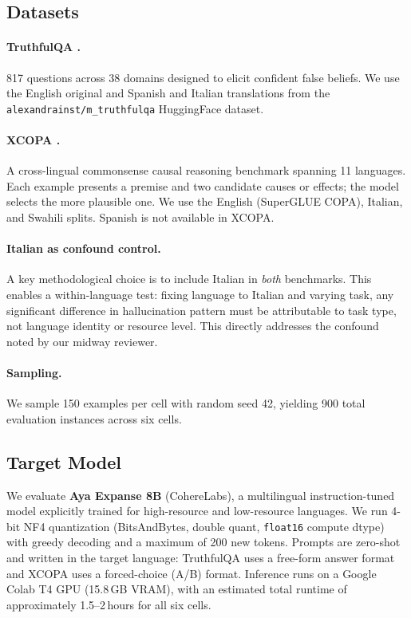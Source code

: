 \documentclass[11pt]{article}
\begin{document}
\subsection{Datasets}

\paragraph{TruthfulQA \cite{lin-etal-2022-truthfulqa}.}
817 questions across 38 domains designed to elicit confident false beliefs. We
use the English original and Spanish and Italian translations from the
\texttt{alexandrainst/m\_truthfulqa} HuggingFace dataset.

\paragraph{XCOPA \cite{ponti-etal-2020-xcopa}.}
A cross-lingual commonsense causal reasoning benchmark spanning 11 languages.
Each example presents a premise and two candidate causes or effects; the model
selects the more plausible one. We use the English (SuperGLUE COPA), Italian,
and Swahili splits. Spanish is not available in XCOPA.

\paragraph{Italian as confound control.}
A key methodological choice is to include Italian in \emph{both} benchmarks.
This enables a within-language test: fixing language to Italian and varying
task, any significant difference in hallucination pattern must be attributable
to task type, not language identity or resource level. This directly addresses
the confound noted by our midway reviewer.

\paragraph{Sampling.}
We sample 150 examples per cell with random seed 42, yielding 900 total
evaluation instances across six cells.

\subsection{Target Model}

We evaluate \textbf{Aya Expanse 8B} (CohereLabs), a multilingual
instruction-tuned model explicitly trained for high-resource and low-resource
languages. We run 4-bit NF4 quantization (BitsAndBytes, double quant,
\texttt{float16} compute dtype) with greedy decoding and a maximum of 200 new
tokens. Prompts are zero-shot and written in the target language: TruthfulQA
uses a free-form answer format and XCOPA uses a forced-choice (A/B) format.
Inference runs on a Google Colab T4 GPU (15.8\,GB VRAM), with an estimated
total runtime of approximately 1.5--2\,hours for all six cells.
\end{document}
